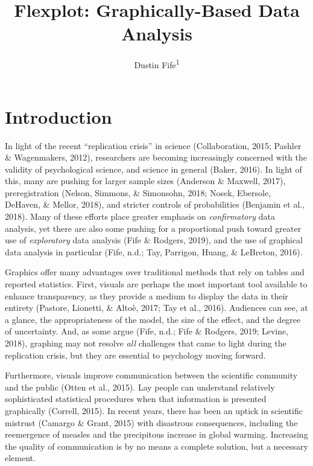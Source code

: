 \documentclass[
  man]{apa6}
\affiliation{
\vspace{0.5cm}
\textsuperscript{1} Rowan University}
\title{Flexplot: Graphically-Based Data Analysis}
\author{Dustin Fife\textsuperscript{1}}
\date{}
\begin{document}
\maketitle

\hypertarget{introduction}{%
\section{Introduction}\label{introduction}}

In light of the recent \enquote{replication crisis} in science (Collaboration, 2015; Pashler \& Wagenmakers, 2012), researchers are becoming increasingly concerned with the validity of psychological science, and science in general (Baker, 2016). In light of this, many are pushing for larger sample sizes (Anderson \& Maxwell, 2017), preregistration (Nelson, Simmons, \& Simonsohn, 2018; Nosek, Ebersole, DeHaven, \& Mellor, 2018), and stricter controls of probabilities (Benjamin et al., 2018). Many of these efforts place greater emphasis on \emph{confirmatory} data analysis, yet there are also some pushing for a proportional push toward greater use of \emph{exploratory} data analysis (Fife \& Rodgers, 2019), and the use of graphical data analysis in particular (Fife, n.d.; Tay, Parrigon, Huang, \& LeBreton, 2016).

Graphics offer many advantages over traditional methods that rely on tables and reported statistics. First, visuals are perhaps the most important tool available to enhance transparency, as they provide a medium to display the data in their entirety (Pastore, Lionetti, \& Altoè, 2017; Tay et al., 2016). Audiences can see, at a glance, the appropriateness of the model, the size of the effect, and the degree of uncertainty. And, as some argue (Fife, n.d.; Fife \& Rodgers, 2019; Levine, 2018), graphing may not resolve \emph{all} challenges that came to light during the replication crisis, but they are essential to psychology moving forward.

Furthermore, visuals improve communication between the scientific community and the public (Otten et al., 2015). Lay people can understand relatively sophisticated statistical procedures when that information is presented graphically (Correll, 2015). In recent years, there has been an uptick in scientific mistrust (Camargo \& Grant, 2015) with disastrous consequences, including the reemergence of measles and the precipitous increase in global warming. Increasing the quality of communication is by no means a complete solution, but a necessary element.
\end{document}
